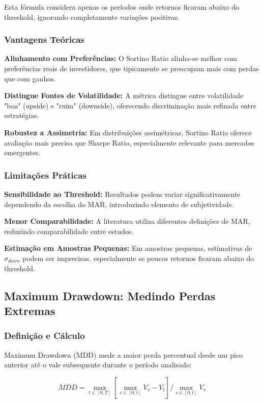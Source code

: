 Esta fórmula considera apenas os períodos onde retornos ficaram abaixo do threshold, ignorando completamente variações positivas.

\subsubsection{Vantagens Teóricas}

\textbf{Alinhamento com Preferências:} O Sortino Ratio alinha-se melhor com preferências reais de investidores, que tipicamente se preocupam mais com perdas que com ganhos.

\textbf{Distingue Fontes de Volatilidade:} A métrica distingue entre volatilidade "boa" (upside) e "ruim" (downside), oferecendo discriminação mais refinada entre estratégias.

\textbf{Robustez a Assimetria:} Em distribuições assimétricas, Sortino Ratio oferece avaliação mais precisa que Sharpe Ratio, especialmente relevante para mercados emergentes.

\subsubsection{Limitações Práticas}

\textbf{Sensibilidade ao Threshold:} Resultados podem variar significativamente dependendo da escolha do MAR, introduzindo elemento de subjetividade.

\textbf{Menor Comparabilidade:} A literatura utiliza diferentes definições de MAR, reduzindo comparabilidade entre estudos.

\textbf{Estimação em Amostras Pequenas:} Em amostras pequenas, estimativas de $\sigma_{down}$ podem ser imprecisas, especialmente se poucos retornos ficaram abaixo do threshold.

\subsection{Maximum Drawdown: Medindo Perdas Extremas}

\subsubsection{Definição e Cálculo}

Maximum Drawdown (MDD) mede a maior perda percentual desde um pico anterior até o vale subsequente durante o período analisado:

\begin{equation}
MDD = \max_{t \in [0,T]} \left[ \max_{s \in [0,t]} V_s - V_t \right] / \max_{s \in [0,t]} V_s
\end{equation}

